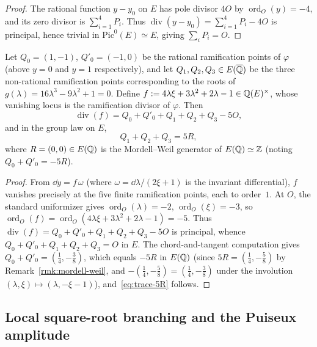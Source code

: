 \begin{proof}
The rational function $y-y_0$ on $E$ has pole divisor $4O$ by $\operatorname{ord}_O(y)=-4$,
and its zero divisor is $\sum_{i=1}^4 P_i$.
Thus $\operatorname{div}(y-y_0)=\sum_{i=1}^4 P_i-4O$ is principal, hence trivial in $\mathrm{Pic}^0(E)\simeq E$,
giving $\sum_i P_i=O$.
\end{proof}

\begin{corollary}\label{cor:ramification-trace}
Let $Q_0=(1,-1)$, $Q'_0=(-1,0)$ be the rational ramification points of $\varphi$ (above $y=0$ and $y=1$ respectively), and let $Q_1,Q_2,Q_3\in E(\overline{\mathbb{Q}})$ be the three non-rational ramification points corresponding to the roots of $g(\lambda)=16\lambda^3-9\lambda^2+1=0$.
Define $f:=4\lambda\xi+3\lambda^2+2\lambda-1\in\mathbb{Q}(E)^\times$, whose vanishing locus is the ramification divisor of $\varphi$.
Then
\[
\operatorname{div}(f)=Q_0+Q'_0+Q_1+Q_2+Q_3-5O,
\]
and in the group law on $E$,
\begin{equation}\label{eq:trace-5R}
Q_1+Q_2+Q_3=5R,
\end{equation}
where $R=(0,0)\in E(\mathbb{Q})$ is the Mordell--Weil generator of $E(\mathbb{Q})\simeq\mathbb{Z}$ (noting $Q_0+Q'_0=-5R$).
\end{corollary}

\begin{proof}
From $\dd y=f\,\omega$ (where $\omega=\dd\lambda/(2\xi+1)$ is the invariant differential), $f$ vanishes precisely at the five finite ramification points, each to order~$1$.
At $O$, the standard uniformizer gives $\operatorname{ord}_O(\lambda)=-2$, $\operatorname{ord}_O(\xi)=-3$, so $\operatorname{ord}_O(f)=\operatorname{ord}_O(4\lambda\xi+3\lambda^2+2\lambda-1)=-5$.
Thus $\operatorname{div}(f)=Q_0+Q'_0+Q_1+Q_2+Q_3-5O$ is principal, whence $Q_0+Q'_0+Q_1+Q_2+Q_3=O$ in $E$.
The chord-and-tangent computation gives $Q_0+Q'_0=(\tfrac{1}{4},-\tfrac{3}{8})$, which equals $-5R$ in $E(\mathbb{Q})$ (since $5R=(\tfrac{1}{4},-\tfrac{5}{8})$ by Remark~\ref{rmk:mordell-weil}, and $-(\tfrac{1}{4},-\tfrac{5}{8})=(\tfrac{1}{4},-\tfrac{3}{8})$ under the involution $(\lambda,\xi)\mapsto(\lambda,-\xi-1)$), and~\eqref{eq:trace-5R} follows.
\end{proof}

\subsection{Local square-root branching and the Puiseux amplitude}

